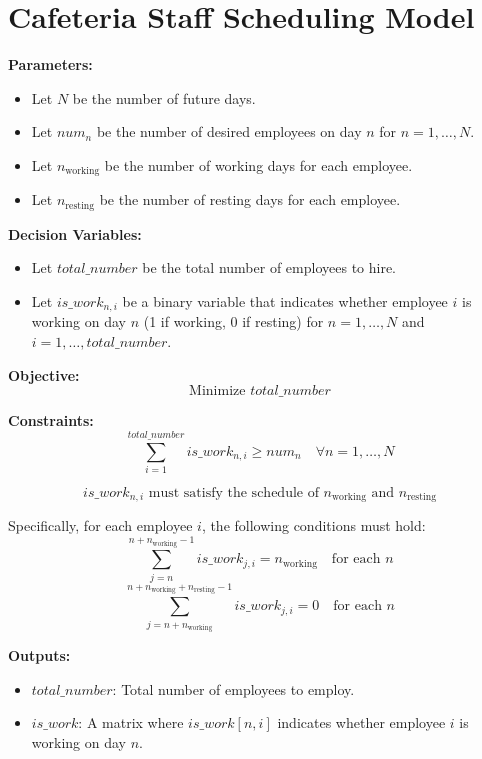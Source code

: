 \documentclass{article}
\begin{document}
\section*{Cafeteria Staff Scheduling Model}

\textbf{Parameters:}
\begin{itemize}
    \item Let $N$ be the number of future days.
    \item Let $num_n$ be the number of desired employees on day $n$ for $n = 1, \ldots, N$.
    \item Let $n_{\text{working}}$ be the number of working days for each employee.
    \item Let $n_{\text{resting}}$ be the number of resting days for each employee.
\end{itemize}

\textbf{Decision Variables:}
\begin{itemize}
    \item Let $total\_number$ be the total number of employees to hire.
    \item Let $is\_work_{n,i}$ be a binary variable that indicates whether employee $i$ is working on day $n$ (1 if working, 0 if resting) for $n = 1, \ldots, N$ and $i = 1, \ldots, total\_number$.
\end{itemize}

\textbf{Objective:}
\[
\text{Minimize } total\_number
\]

\textbf{Constraints:}
\begin{equation}
\sum_{i=1}^{total\_number} is\_work_{n,i} \geq num_n \quad \forall n = 1, \ldots, N
\end{equation}

\begin{equation}
is\_work_{n,i} \text{ must satisfy the schedule of } n_{\text{working}} \text{ and } n_{\text{resting}} 
\end{equation}

Specifically, for each employee $i$, the following conditions must hold:
\begin{equation}
\sum_{j=n}^{n+n_{\text{working}}-1} is\_work_{j,i} = n_{\text{working}} \quad \text{for each } n
\end{equation}
\begin{equation}
\sum_{j=n+n_{\text{working}}}^{n+n_{\text{working}}+n_{\text{resting}}-1} is\_work_{j,i} = 0 \quad \text{for each } n
\end{equation}

\textbf{Outputs:}
\begin{itemize}
    \item $total\_number$: Total number of employees to employ.
    \item $is\_work$: A matrix where $is\_work[n,i]$ indicates whether employee $i$ is working on day $n$.
\end{itemize}
\end{document}

